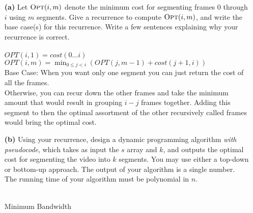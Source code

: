 \documentclass[11pt]{article}
\theoremstyle{definition}
\theoremstyle{theorem}
\newcommand{\opt}{\mbox{{\sc Opt}}}
\begin{document}
\begin{itemize}
	\item[{\bf (a)}] Let $\opt(i,m)$ denote the minimum cost for
	segmenting frames $0$ through $i$ using $m$ segments.  Give a
	recurrence to compute $\opt(i,m)$, and write the base case(s) for
	this recurrence.  Write a few sentences explaining why your
	recurrence is correct. \\\\
 $OPT(i, 1) = cost(0 \ldots i)$ \\
$OPT(i, m) = \min_{0 \leq j < i} (OPT(j, m - 1) + cost(j + 1, i))$	\\
Base Case: When you want only one segment you can just return the cost of all the frames. \\
Otherwise, you can recur down the other frames and take the minimum amount that would result in grouping $i - j$ frames together. Adding this segment to then the optimal assortment of the other recursively called frames would bring the optimal cost.

\newpage
 
	\item[{\bf (b)}] Using your recurrence, design a dynamic programming
	algorithm {\em with pseudocode}, which takes as input the $s$ array and $k$, and outputs
	the optimal cost for segmenting the video into $k$ segments. You may
	use either a top-down or bottom-up approach.  The output of your
	algorithm is a single number.  The running time of your algorithm
	must be polynomial in $n$. \\\\
\begin{algorithm}[H]
\caption{Minimum Bandwidth}
\end{algorithm} 


\end{itemize}
\end{document}
